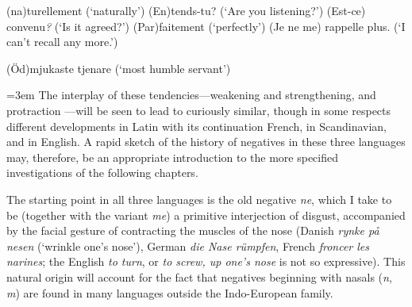 \begin{samepage}

\ea \label{ex:01-04}
\ea (na)turellement \phantom{x} (`naturally')
\ex (En)tends-tu? \phantom{x} (`Are you listening?')
\ex (Est-ce) convenu\textit{?} \phantom{x} (`Is it agreed?')
\ex (Par)faitement \phantom{x} (`perfectly')
\ex (Je ne me) rappelle plus. \phantom{x} (`I can't recall any more.')
\z
\z
\end{samepage}

\ea \label{ex:01-05}
(Öd)mjukaste tjenare \phantom{x} (`most humble servant')

\z


\label{rapid_sketch}

\emergencystretch=3em %
The interplay of these tendencies---weakening and strengthening, and pro\-traction%
---will be seen to lead to curiously similar, though in some respects different developments in Latin with its continuation French, in Scandinavian, and in English. A rapid sketch of the history of negatives in these three languages may, therefore, be an appropriate introduction to the more specified investigations of the following chapters.

The starting point in all three languages is the old negative \textit{ne}, which I take to be (together with the variant \textit{me}) a primitive interjection of disgust, accompanied by the facial gesture of contracting the muscles of the nose (Danish \textit{rynke på nesen} (`wrinkle one's nose'), German \textit{die Nase rümpfen}, French \textit{froncer les narines}; the English \textit{to turn}, or \textit{to screw, up one's nose} is not so expressive). This natural origin will account for the fact that negatives beginning with nasals (\textit{n}, \textit{m}) are found in many languages outside the Indo-European family.

